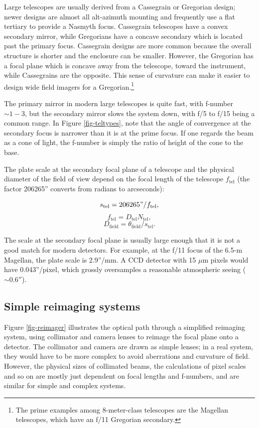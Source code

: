 \documentclass[12pt]{article}
\begin{document}
Large telescopes are usually derived from a Cassegrain or
Gregorian design; newer designs are almost all alt-azimuth 
mounting and frequently use a flat tertiary to provide a
Nasmyth focus.  Cassegrain telescopes have a convex secondary
mirror, while Gregorians have a concave secondary which is
located past the primary focus.  Cassegrain designs are more
common because the overall structure is shorter and the
enclosure can be smaller.  However, the Gregorian has a focal
plane which is concave away from the telescope, toward the
instrument, while Cassegrains are the opposite.  This sense
of curvature can make it easier to design wide field imagers
for a Gregorian.\footnote{The prime examples among 8-meter-class
telescopes are the Magellan telescopes, which have an f/11 Gregorian
secondary.}

The primary mirror in modern large telescopes is quite fast, with
f-number $\sim 1-3$, but the secondary mirror slows the system
down, with f/5 to f/15 being a common range.  In Figure
\ref{fig-teltypes}, note that the angle of convergence
at the secondary focus is narrower than it is at the prime
focus.  If one regards the beam as a cone of light, the f-number 
is simply the ratio of height of the cone to the base.

The plate scale at the secondary focal plane of a telescope and
the physical diameter of the field of view depend on the
focal length of the telescope $f_{\mathrm{tel}}$
(the factor 206265'' converts from radians to arcseconds):
 
$$ s_{\mathrm{tel}} = 206265" / f_{\mathrm{tel}}, $$
$$ f_{\mathrm{tel}} = D_{\mathrm{tel}} N_{\mathrm{tel}}, $$
$$ D_{\mathrm{field}} = \theta_{\mathrm{field}} / s_{\mathrm{tel}}. $$

The scale at the secondary focal plane is usually large 
enough that it is not a good match for modern detectors.
For example, at the f/11 focus of the 6.5-m Magellan,
the plate scale is 2.9''/mm.  A CCD detector with 15 $\mu$m pixels
would have 0.043''/pixel, which grossly oversamples a
reasonable atmospheric seeing ($\sim 0.6''$).

\subsection{Simple reimaging systems}

Figure \ref{fig-reimager} illustrates the optical path
through a simplified reimaging system, using collimator 
and camera lenses to reimage the focal plane onto a detector.
The collimator and camera are drawn as simple lenses;
in a real system, they would have to be more complex
to avoid aberrations and curvature of field.  However,
the physical sizes of collimated beams,
the calculations of pixel scales and so on are mostly 
just dependent on focal lengths and f-numbers, and are
similar for simple and complex systems.
\end{document}
